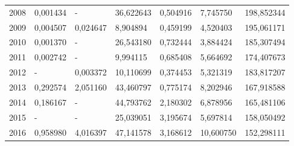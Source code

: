 \begin{table}
\begin{tabular}{p{1cm}p{2cm}p{2cm}p{2cm}p{2cm}p{2cm}p{2cm}}
 2008 &                                  0,001434 &                                - &                       36,622643 &                          0,504916 &                                     7,745750 &                     198,852344 \\
 2009 &                                  0,004507 &                         0,024647 &                        8,904894 &                          0,459199 &                                     4,520403 &                     195,061171 \\
 2010 &                                  0,001370 &                                - &                       26,543180 &                          0,732444 &                                     3,884424 &                     185,307494 \\
 2011 &                                  0,002742 &                                - &                        9,994115 &                          0,685408 &                                     5,664692 &                     174,407673 \\
 2012 &                                         - &                         0,003372 &                       10,110699 &                          0,374453 &                                     5,321319 &                     183,817207 \\
 2013 &                                  0,292574 &                         2,051160 &                       43,460797 &                          0,775174 &                                     8,202946 &                     167,918588 \\
 2014 &                                  0,186167 &                                - &                       44,793762 &                          2,180302 &                                     6,878956 &                     165,481106 \\
 2015 &                                         - &                                - &                       25,039051 &                          3,195674 &                                     5,697814 &                     158,050492 \\
 2016 &                                  0,958980 &                         4,016397 &                       47,141578 &                          3,168612 &                                    10,600750 &                     152,298111 \\
\bottomrule
\end{tabular}
\end{table}
